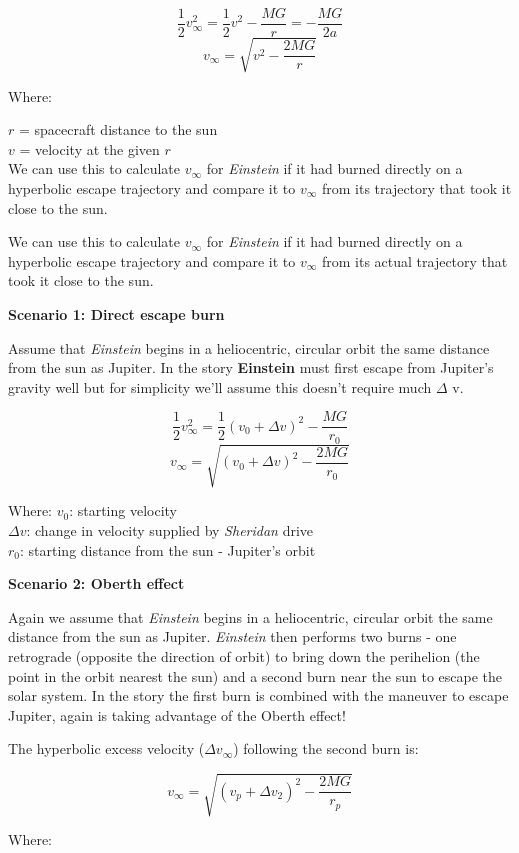 \documentclass[12pt]{article} %
\begin{document}
$$\frac{1}{2}v_{\infty}^{2} = \frac{1}{2} v^2 - \frac{MG}{r} = -\frac{MG}{2a}$$
$$v_{\infty} = \sqrt{v^2-\frac{2MG}{r}}$$

Where:

$r$ = spacecraft distance to the sun\\
$v$ = velocity at the given $r$\\

We can use this to calculate $v_{\infty}$ for \textit{Einstein} if it had burned directly on a hyperbolic escape trajectory and compare it to $v_{\infty}$ from its trajectory that took it close to the sun.

We can use this to calculate $v_{\infty}$ for \textit{Einstein} if it had burned directly on a hyperbolic escape trajectory and compare it to $v_{\infty}$ from its actual trajectory that took it close to the sun.

\textbf{Scenario 1: Direct escape burn}

Assume that \textit{Einstein} begins in a heliocentric, circular orbit the same distance from the sun as Jupiter. In the story \textbf{Einstein} must first escape from Jupiter's gravity well but for simplicity we'll assume this doesn't require much $\Delta$ v.

$$\frac{1}{2}v_{\infty}^{2} = \frac{1}{2} (v_0 + \Delta v)^2 - \frac{MG}{r_0}$$
$$v_{\infty} = \sqrt{(v_0 + \Delta v)^2-\frac{2MG}{r_0}}$$

Where:
$v_0$: starting velocity\\
$\Delta v$: change in velocity supplied by \textit{Sheridan} drive\\
$r_0$: starting distance from the sun - Jupiter's orbit


\textbf{Scenario 2: Oberth effect}

Again we assume that \textit{Einstein} begins in a heliocentric, circular orbit the same distance from the sun as Jupiter. \textit{Einstein} then performs two burns - one retrograde (opposite the direction of orbit) to bring down the perihelion (the point in the orbit nearest the sun) and a second burn near the sun to escape the solar system. In the story the first burn is combined with the maneuver to escape Jupiter, again is taking advantage of the Oberth effect!

The hyperbolic excess velocity ($\Delta v_{\infty}$) following the second burn is:

$$v_{\infty} = \sqrt{(v_p + \Delta v_2)^2-\frac{2MG}{r_p}}$$

Where:
\end{document}
